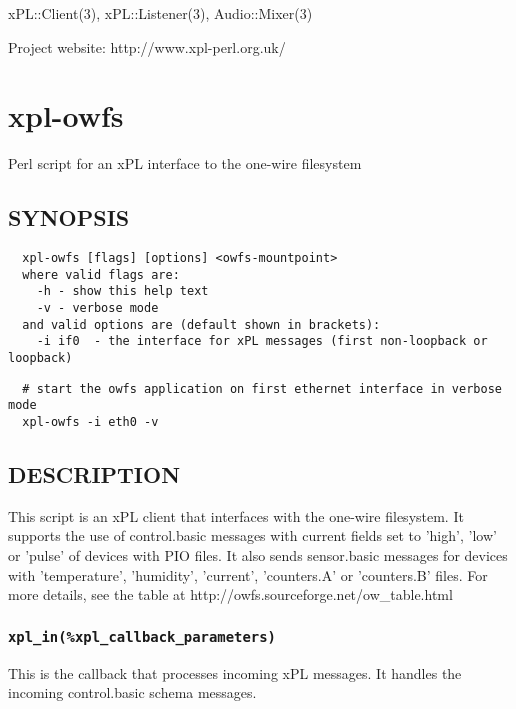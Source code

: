 xPL::Client(3), xPL::Listener(3), Audio::Mixer(3)



Project website: http://www.xpl-perl.org.uk/

\section{xpl-owfs\label{xpl-owfs}}


Perl script for an xPL interface to the one-wire filesystem

\subsection*{SYNOPSIS\label{xpl-owfs_SYNOPSIS}}
\begin{verbatim}
  xpl-owfs [flags] [options] <owfs-mountpoint>
  where valid flags are:
    -h - show this help text
    -v - verbose mode
  and valid options are (default shown in brackets):
    -i if0  - the interface for xPL messages (first non-loopback or loopback)
\end{verbatim}
\begin{verbatim}
  # start the owfs application on first ethernet interface in verbose mode
  xpl-owfs -i eth0 -v
\end{verbatim}
\subsection*{DESCRIPTION\label{xpl-owfs_DESCRIPTION}}


This script is an xPL client that interfaces with the one-wire
filesystem.  It supports the use of control.basic messages with
current fields set to 'high', 'low' or 'pulse' of devices with PIO
files.  It also sends sensor.basic messages for devices with
'temperature', 'humidity', 'current', 'counters.A' or 'counters.B'
files.  For more details, see the table at http://owfs.sourceforge.net/ow\_table.html

\subsubsection*{\texttt{xpl\_in(\%xpl\_callback\_parameters)}\label{xpl-owfs_xpl_in_xpl_callback_parameters_}}


This is the callback that processes incoming xPL messages.  It handles
the incoming control.basic schema messages.

